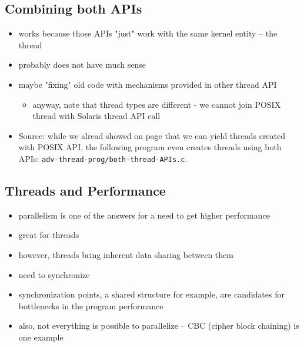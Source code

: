 
\subsection{Combining both APIs}

\begin{itemize}
\item works because those APIs "just" work with the same kernel entity -- the
thread
\item probably does not have much sense
\item maybe "fixing" old code with mechanisms provided in other thread API
	\begin{itemize}
	\item anyway, note that thread types are different - we cannot join
	POSIX thread with Solaris thread API call
	\end{itemize}
\end{itemize}

\begin{itemize}
\item Source: while we alread showed on page \pageref{THREAD_YIELD} that we can
yield threads created with POSIX API, the following program even creates threads
using both APIs: \texttt{adv-thread-prog/both-thread-APIs.c}.
\end{itemize}


\subsection{Threads and Performance}

\begin{itemize}
\item parallelism is one of the answers for a need to get higher performance
\item great for threads
\item however, threads bring inherent data sharing between them
\item need to synchronize
\item synchronization points, a shared structure for example, are candidates for
bottlenecks in the program performance
\item also, not everything is possible to parallelize -- CBC (cipher block
chaining) is one example
\end{itemize}


